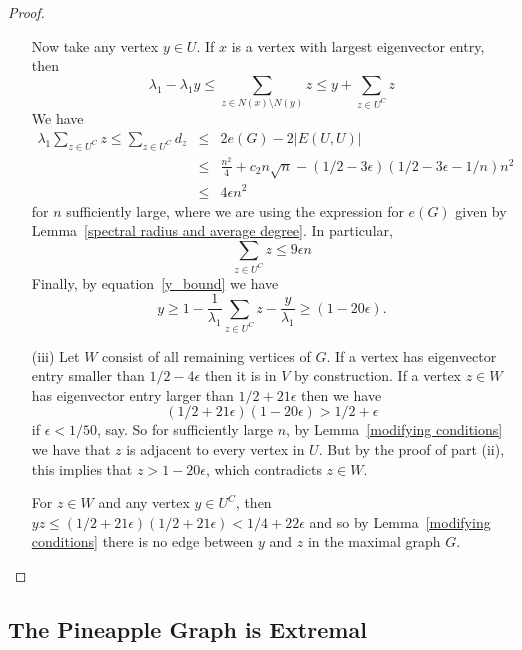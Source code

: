 \begin{proof}
\begin{itemize}
Now take any vertex $y \in U$.  If $x$ is a vertex with largest eigenvector entry, then 
\begin{equation}\label{y_bound}
 \lambda_1 - \lambda_1 y \leq \sum_{z \in N(x) \setminus N(y)} z \leq y + \sum_{z \in U^C} z 
\end{equation}
We have
 \begin{eqnarray*}
  \lambda_1 \sum_{z \in U^C} z \leq \sum_{z \in U^C} d_z &\leq& 2e(G) - 2|E(U,U)|\\
   &\leq& \frac{n^2}{4} + c_2 n \sqrt{n} - (1/2 - 3\epsilon)(1/2 - 3 \epsilon - 1/n) n^2 \\
   &\leq & 4 \epsilon n^2
 \end{eqnarray*}
for $n$ sufficiently large, where we are using the expression for $e(G)$ given by Lemma~\ref{spectral radius and average degree}.
In particular,
 \[ \sum_{z \in U^C} z \leq 9 \epsilon n \] 
Finally, by equation~\ref{y_bound} we have 
 \[ y \geq 1 - \frac{1}{\lambda_1} \sum_{z \in U^C} z -\frac{y}{\lambda_1} \geq (1 - 20 \epsilon) .\]
 
\item[(iii)] Let $W$ consist of all remaining vertices of $G$.  If a vertex 
has eigenvector entry smaller than $1/2 - 4\epsilon$ then it is in $V$ by
construction.  If a vertex $z \in W$ has eigenvector entry larger than $1/2 + 21\epsilon$
then we have
 \[ (1/2 + 21 \epsilon) (1 - 20 \epsilon) > 1/2 + \epsilon \]
if $\epsilon < 1/50$, say.   So for sufficiently large $n$, by Lemma~\ref{modifying conditions} we 
have that $z$ is adjacent to every vertex in $U$.  But by the proof of part (ii), this implies that $z > 1 - 20\epsilon$, which contradicts $z \in W$.

For $z \in W$ and any vertex $y \in U^C$, then 
 $yz \leq (1/2 + 21 \epsilon)(1/2 + 21\epsilon) < 1/4 + 22 \epsilon$
and so by Lemma~\ref{modifying conditions} there is no edge between $y$ and 
$z$ in the maximal graph $G$.
\end{itemize}
\end{proof}

\subsection{The Pineapple Graph is Extremal}

